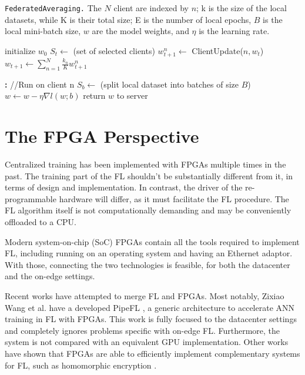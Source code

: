 \begin{algorithm}[H]
    \caption[FederatedAveraging]{\texttt{FederatedAveraging.} The \(N\) client are indexed by \(n\); k is the size of the local datasets, while K is their total size; E is the number of local epochs, \(B\) is the local mini-batch size, \(w\) are the model weights, and \(\eta\) is the learning rate.}
    \label{alg:FederatedAveraging}
    \begin{algorithmic}
            \State initialize $w_0$
                \State $S_{t} \gets$ (set of selected clients)
                    \State $w_{t+1}^n \gets$ ClientUpdate($n,w_t$)
                \EndFor
                \State $w_{t+1} \gets \sum_{n=1}^{N} \frac{k_n}{K} w_{t+1}^n$
            \EndFor
        \EndFunction
        
        \textbf{:} //Run on client n
            \State $S_b \gets $ (split local dataset into batches of size $B$)
                    \State $w \gets w - \eta \nabla l(w;b)$
                \EndFor
            \EndFor
            \State return $w$ to server
        \EndFunction
    \end{algorithmic}
\end{algorithm}


\section{The FPGA Perspective}
Centralized training has been implemented with FPGAs multiple times in the past. The training part of the FL shouldn't be substantially different from it, in terms of design and implementation. In contrast, the driver of the re-programmable hardware will differ, as it must facilitate the FL procedure. The FL algorithm itself is not computationally demanding and may be conveniently offloaded to a CPU. 

Modern system-on-chip (SoC) FPGAs contain all the tools required to implement FL, including running on an operating system and having an Ethernet adaptor. With those, connecting the two technologies is feasible, for both the datacenter and the on-edge settings.

Recent works have attempted to merge FL and FPGAs. Most notably, Zixiao Wang et al. have a developed PipeFL \cite{PipeFL}, a generic architecture to accelerate ANN training in FL with FPGAs. This work is fully focused to the datacenter settings and completely ignores problems specific with on-edge FL. Furthermore, the system is not compared with an equivalent GPU implementation. Other works have shown that FPGAs are able to efficiently implement complementary systems for FL, such as homomorphic encryption \cite{FPGA_encryption_for_FL}.
